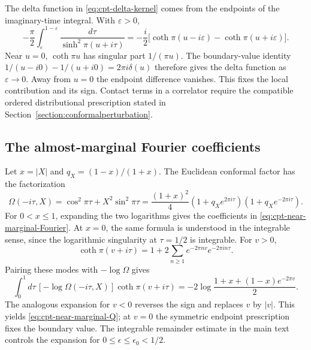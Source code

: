 \documentclass[a4paper,11pt]{article}
\theoremstyle{definition}
\begin{document}
The delta function in \eqref{eq:cpt-delta-kernel} comes from the endpoints of the
imaginary-time integral. With $\varepsilon>0$,
\begin{equation}
 -\frac{\pi}{2}\int_\varepsilon^{1-\varepsilon}
 \frac{d\tau}{\sinh^2\pi(u+i\tau)}
 =-\frac{i}{2}\bigl[\coth\pi(u-i\varepsilon)
                    -\coth\pi(u+i\varepsilon)\bigr].
\end{equation}
Near $u=0$, $\coth\pi u$ has singular part $1/(\pi u)$. The boundary-value
identity $1/(u-i0)-1/(u+i0)=2\pi i\delta(u)$ therefore gives the delta function
as $\varepsilon\to0$. Away from $u=0$ the endpoint difference vanishes.
This fixes the local contribution and its sign. Contact terms in a correlator
require the compatible ordered distributional prescription stated in
Section~\ref{section:conformalperturbation}.

\subsection{The almost-marginal Fourier coefficients}

Let $x=|X|$ and $q_X=(1-x)/(1+x)$. The Euclidean conformal factor has the
factorization
\begin{equation}
 \Omega(-i\tau,X)=\cos^2\pi\tau+X^2\sin^2\pi\tau
 =\frac{(1+x)^2}{4}
 (1+q_Xe^{2\pi i\tau})(1+q_Xe^{-2\pi i\tau}).
\end{equation}
For $0<x\leq1$, expanding the two logarithms gives the coefficients in
\eqref{eq:cpt-near-marginal-Fourier}. At $x=0$, the same formula is understood
in the integrable sense, since the logarithmic singularity at $\tau=1/2$ is
integrable. For $v>0$,
\begin{equation}
 \coth\pi(v+i\tau)=1+2\sum_{n\geq1}e^{-2\pi nv}e^{-2\pi in\tau}.
\end{equation}
Pairing these modes with $-\log\Omega$ gives
\begin{equation}
 \int_0^1d\tau\,[-\log\Omega(-i\tau,X)]\coth\pi(v+i\tau)
 =-2\log\frac{1+x+(1-x)e^{-2\pi v}}{2}.
\end{equation}
The analogous expansion for $v<0$ reverses the sign and replaces $v$ by $|v|$.
This yields \eqref{eq:cpt-near-marginal-Q}; at $v=0$ the symmetric endpoint
prescription fixes the boundary value. The integrable remainder estimate in
the main text controls the expansion for $0\leq\epsilon\leq\epsilon_0<1/2$.



\end{document}
